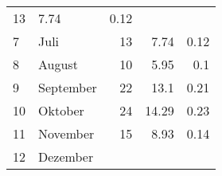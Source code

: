\begin{longtable}{lXrrr}
       \num{13} &
       \num[round-mode=places,round-precision=2]{7,74} &
         \num[round-mode=places,round-precision=2]{0,12} \\

     7 &
     \multicolumn{1}{X}{ Juli   } &


       \num{13} &
       \num[round-mode=places,round-precision=2]{7,74} &
         \num[round-mode=places,round-precision=2]{0,12} \\

     8 &
     \multicolumn{1}{X}{ August   } &


       \num{10} &
       \num[round-mode=places,round-precision=2]{5,95} &
         \num[round-mode=places,round-precision=2]{0,1} \\

     9 &
     \multicolumn{1}{X}{ September   } &


       \num{22} &
       \num[round-mode=places,round-precision=2]{13,1} &
         \num[round-mode=places,round-precision=2]{0,21} \\

     10 &
     \multicolumn{1}{X}{ Oktober   } &


       \num{24} &
       \num[round-mode=places,round-precision=2]{14,29} &
         \num[round-mode=places,round-precision=2]{0,23} \\

     11 &
     \multicolumn{1}{X}{ November   } &


       \num{15} &
       \num[round-mode=places,round-precision=2]{8,93} &
         \num[round-mode=places,round-precision=2]{0,14} \\

     12 &
     \multicolumn{1}{X}{ Dezember   } &



\end{longtable}
